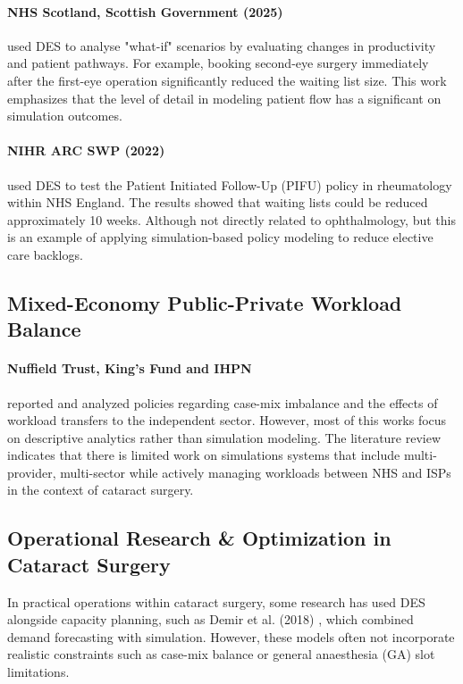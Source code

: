 \documentclass[ %
                    author={Nattanan Nawakitbamrung},
                supervisor={Dr. Sébastien Rochat},
                    degree={MSc},
                     title={Developing and Evaluating the Impact of a Single Patient Treatment List (PTL) for an NHS Integrated Care System},
                  subtitle={},
                      type={},
                      year={2025}]{dissertation}
\begin{document}
\paragraph{NHS Scotland, Scottish Government (2025)} \cite{scotgov2025des} used DES to analyse "what-if" scenarios by evaluating changes in productivity and patient pathways. For example, booking second-eye surgery immediately after the first-eye operation significantly reduced the waiting list size. This work emphasizes that the level of detail in modeling patient flow has a significant on simulation outcomes.

\paragraph{NIHR ARC SWP (2022)} \cite{nihr2022pifu} used DES to test the Patient Initiated Follow-Up (PIFU) policy in rheumatology within NHS England. The results showed that waiting lists could be reduced approximately 10 weeks. Although not directly related to ophthalmology, but this is an example of applying simulation-based policy modeling to reduce elective care backlogs.

\subsection{Mixed-Economy Public-Private Workload Balance}
\paragraph{Nuffield Trust, King’s Fund and IHPN} \cite{nuffield2024hospital, kingsfund2023backlog, ihpn2025stats} reported and analyzed  policies regarding case-mix imbalance and the effects of workload transfers to the independent sector. However, most of this works focus on descriptive analytics rather than simulation modeling. The literature review indicates that there is limited work on simulations systems that include multi-provider, multi-sector while actively managing workloads between NHS and ISPs in the context of cataract surgery.

\subsection{Operational Research & Optimization in Cataract Surgery}
In practical operations within cataract surgery, some research has used DES alongside capacity planning, such as Demir et al. (2018) \cite{demir2018des}, which combined demand forecasting with simulation. However, these models often not incorporate realistic constraints such as case-mix balance or general anaesthesia (GA) slot limitations.
\end{document}
